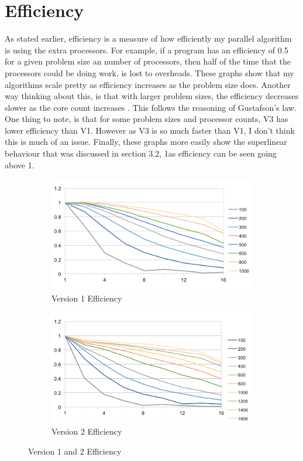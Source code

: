 \documentclass{report}
\begin{document}
\section{Efficiency}
As stated earlier, efficiency is a measure of how efficiently my parallel algorithm is using the extra processors. For example, if a program has an efficiency of 0.5 for a given problem size an number of processors, then half of the time that the processors could be doing work, is lost to overheads. These graphs show that my algorithms scale pretty as efficiency increases as the problem size does. Another way thinking about this, is that with larger problem sizes, the efficiency decreases slower as the core count increases . This follows the reasoning of Gustafson's law. One thing to note, is that for some problem sizes and processor counts, V3 has lower efficiency than V1. However as V3 is so much faster than V1, I don't think this is much of an issue. Finally, these graphs more easily show the superlinear behaviour that was discussed in section 3.2, 1as efficiency can be seen going above 1.
\begin{figure}[h]
\begin{subfigure}{0.5\textwidth}
\includegraphics[width=1\linewidth, height=5cm]{V1-Efficiency} 
\caption{Version 1 Efficiency}
\label{fig:subim4}
\end{subfigure}
\begin{subfigure}{0.5\textwidth}
\includegraphics[width=1\linewidth, height=5cm]{V2-Efficiency} 
\caption{Version 2 Efficiency}
\label{fig:subim5}
\end{subfigure}
\caption{Version 1 and 2 Efficiency}
\end{figure}
\end{document}
